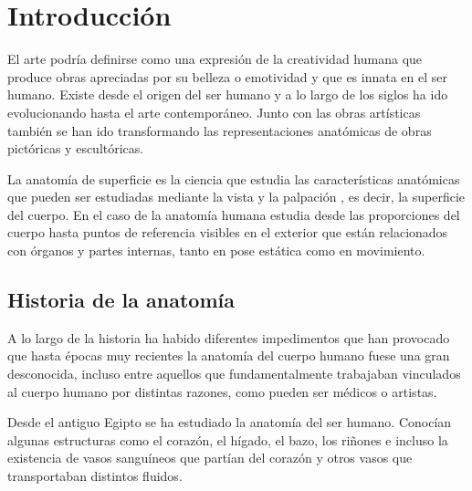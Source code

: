 \section{Introducción} %
El arte podría definirse como una expresión de la creatividad humana que produce obras apreciadas por su belleza o emotividad y que es innata en el ser humano. Existe desde el origen del ser humano y  %
a lo largo de los siglos ha ido evolucionando hasta el arte contemporáneo. Junto con las obras artísticas también se han ido transformando las representaciones anatómicas de obras pictóricas y escultóricas.

La anatomía de superficie es la ciencia que estudia las características anatómicas que pueden ser estudiadas mediante la vista y la palpación%
, es decir, la superficie del cuerpo. En el caso de la anatomía humana estudia desde las proporciones del cuerpo hasta puntos de referencia visibles en el exterior que están relacionados con órganos y partes internas, tanto en pose estática como en movimiento. %

\subsection{Historia de la anatomía}
A lo largo de la historia ha habido diferentes impedimentos que han provocado que hasta épocas muy recientes la anatomía del cuerpo humano fuese una gran desconocida, incluso entre aquellos que fundamentalmente trabajaban vinculados al cuerpo humano por distintas razones, como pueden ser médicos o artistas.

Desde el antiguo Egipto se ha estudiado la anatomía del ser humano. Conocían algunas estructuras como el corazón, el hígado, el bazo, los riñones e incluso la existencia de vasos sanguíneos que partían del corazón y otros vasos que transportaban distintos fluidos.

